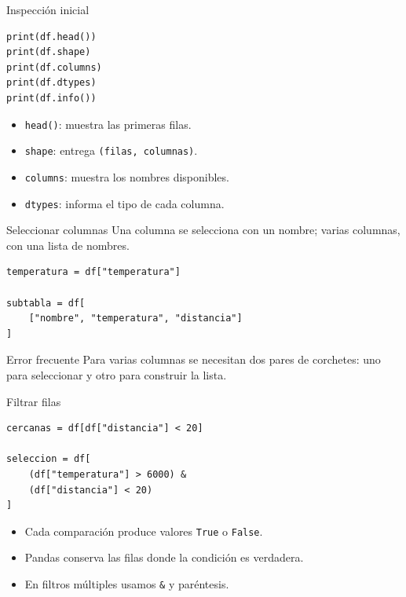\documentclass[10pt]{beamer}
\begin{document}
\begin{frame}[fragile]{Inspección inicial}
\begin{verbatim}
print(df.head())
print(df.shape)
print(df.columns)
print(df.dtypes)
print(df.info())
\end{verbatim}

  \begin{itemize}
    \item \texttt{head()}: muestra las primeras filas.
    \item \texttt{shape}: entrega \texttt{(filas, columnas)}.
    \item \texttt{columns}: muestra los nombres disponibles.
    \item \texttt{dtypes}: informa el tipo de cada columna.
  \end{itemize}
\end{frame}

\begin{frame}[fragile]{Seleccionar columnas}
  Una columna se selecciona con un nombre; varias columnas, con una lista de nombres.

\begin{verbatim}
temperatura = df["temperatura"]

subtabla = df[
    ["nombre", "temperatura", "distancia"]
]
\end{verbatim}

  \begin{alertblock}{Error frecuente}
    Para varias columnas se necesitan dos pares de corchetes: uno para seleccionar y otro para construir la lista.
  \end{alertblock}
\end{frame}

\begin{frame}[fragile]{Filtrar filas}
\begin{verbatim}
cercanas = df[df["distancia"] < 20]

seleccion = df[
    (df["temperatura"] > 6000) &
    (df["distancia"] < 20)
]
\end{verbatim}

  \begin{itemize}
    \item Cada comparación produce valores \texttt{True} o \texttt{False}.
    \item Pandas conserva las filas donde la condición es verdadera.
    \item En filtros múltiples usamos \texttt{\&} y paréntesis.
  \end{itemize}
\end{frame}
\end{document}
